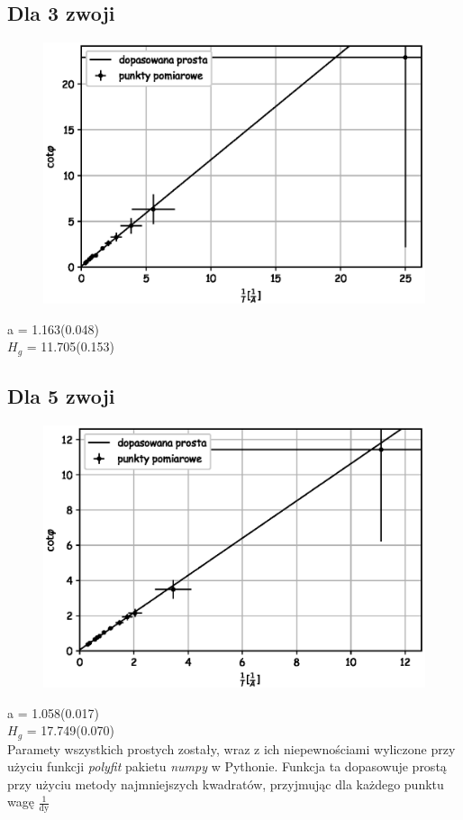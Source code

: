 \documentclass[a4paper,10pt]{article}
\begin{document}
\subsection{Dla 3 zwoji}

\begin{figure}[H]
  \includegraphics{./wykres_3.eps}
  \caption{}
  \label{}
\end{figure}
a = 1.163(0.048)\\
$H_g$ = 11.705(0.153)\\
\subsection{Dla 5 zwoji}

\begin{figure}[H]
  \includegraphics{./wykres_5.eps}
  \caption{}
  \label{}
\end{figure}
a = 1.058(0.017)\\
$H_g$ = 17.749(0.070)\\
Paramety wszystkich prostych zostały, wraz z ich niepewnościami wyliczone przy użyciu funkcji \emph{polyfit} pakietu \emph{numpy} w Pythonie. Funkcja ta
dopasowuje prostą przy użyciu metody najmniejszych kwadratów, przyjmując dla każdego punktu wagę $\frac{1}{\text{dy}}$
\end{document}
